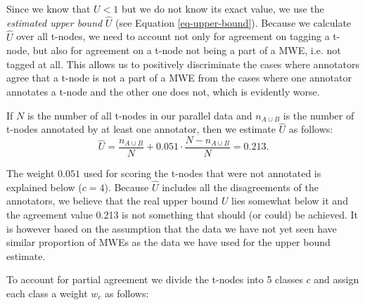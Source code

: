 Since we know that $U < 1$ but we do not know its exact value, we use the \textit{estimated upper bound} $\widehat{U}$ (see Equation \ref{eq-upper-bound}). Because we calculate $\widehat{U}$ over all t-nodes, we need to account not only for agreement on tagging a t-node, but also for agreement on a t-node not being a part of a MWE, i.e. not tagged at all. 
%
%
This allows us to positively discriminate the cases where annotators agree that a t-node is not a part of a MWE from the cases where one annotator annotates a t-node and the other one does not, which is evidently worse.

If $N$ is the number of all t-nodes in our parallel data and $n_{A \cup B}$ is the number of t-nodes annotated by at least one annotator, then we estimate $\widehat{U}$ as follows:
\begin{equation}
\label{eq-upper-bound}
\widehat{U} = \frac{n_{A \cup B}}{N} + 0.051 \cdot \frac{N - n_{A \cup B}}{N}= 0.213.
\end{equation}

The weight $0.051$ used for scoring the t-nodes that were not annotated is explained below ($c=4$). Because $\widehat{U}$ includes all the disagreements of the annotators, we believe that the real upper bound $U$ lies somewhat below it and the agreement value 0.213 is not something that should (or could) be achieved. It is however based on the assumption that the data we have not yet seen have similar proportion of MWEs as the data we have used for the upper bound estimate.

To account for partial agreement we divide the t-nodes into 5 classes $c$ and assign each class a weight $w_c$ as follows: 

